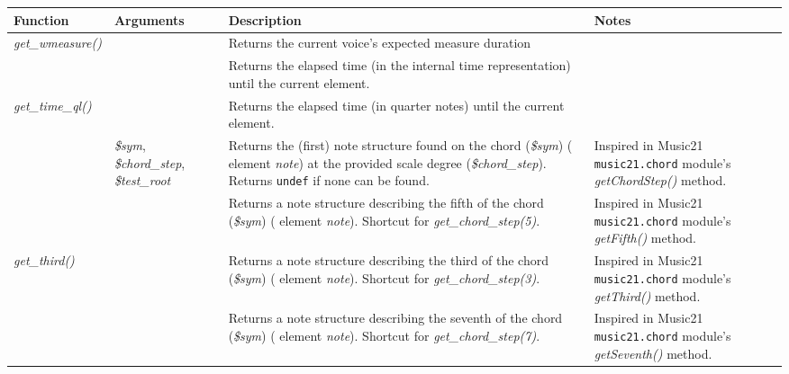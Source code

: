 \begin{center}
  \begin{tabular}{|p{2.75cm}|p{2.25cm}|p{5.5cm}|p{4.5cm}|}
    \hline
    Function & Arguments & Description & Notes \\
    \hline
    \hline
    \multirow{2}{*}{\emph{get\_wmeasure()}}
    &
    & Returns the current voice's expected measure duration
    &
    \\
    \hline

    \hline
    \multirow{4}{*}{\emph{get\_time()}}
    &
    & Returns the elapsed time (in the internal time representation) until the current element.
    &
    \\
    \hline

    \hline
    \multirow{3}{*}{\emph{get\_time\_ql()}}
    &
    & Returns the elapsed time (in quarter notes) until the current element.
    &
    \\
    \hline

    \hline
    \multirow{4}{*}{\emph{get\_chord\_step()}}
    & \multirow{4}{3cm}{\emph{\$sym}, \emph{\$chord\_step}, \emph{\$test\_root}}
    & Returns the (first) note structure found on the chord (\emph{\$sym}) (\abc{} element
    \emph{note}) at the provided scale degree (\emph{\$chord\_step}). Returns \texttt{undef} if none
    can be found.
    & Inspired in Music21 \texttt{music21.chord} module's \emph{getChordStep()} method.
    \\
    \hline

    \hline
    \multirow{3}{*}{\emph{get\_fifth()}}
    & \multirow{3}{*}{\emph{\$sym}}
    & Returns a note structure describing the fifth of the chord (\emph{\$sym}) (\abc{} element
    \emph{note}).  Shortcut for \emph{get\_chord\_step(5)}.
    & Inspired in Music21 \texttt{music21.chord} module's \emph{getFifth()} method.
    \\
    \hline

    \hline
    \multirow{4}{*}{\emph{get\_third()}}
    & \multirow{4}{*}{\emph{\$sym}}
    & Returns a note structure describing the third of the chord (\emph{\$sym}) (\abc{} element
    \emph{note}).  Shortcut for \emph{get\_chord\_step(3)}.
    & Inspired in Music21 \texttt{music21.chord} module's \emph{getThird()} method.
    \\
    \hline

    \hline
    \multirow{4}{*}{\emph{get\_seventh()}}
    & \multirow{4}{*}{\emph{\$sym}}
    & Returns a note structure describing the seventh of the chord (\emph{\$sym}) (\abc{} element
    \emph{note}).  Shortcut for \emph{get\_chord\_step(7)}.
    & Inspired in Music21 \texttt{music21.chord} module's \emph{getSeventh()} method.
    \\
    \hline

  \end{tabular}
\end{center}

